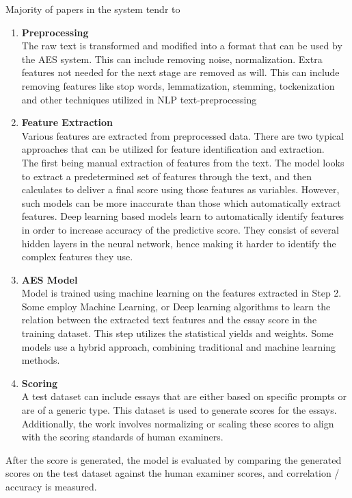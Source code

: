 \documentclass{article}
\begin{document}
Majority of papers in the system tendr to 
\begin{enumerate}
    \item \textbf{Preprocessing} \\ The raw text is transformed and modified into a format that can be used by the AES system. This can include removing noise, normalization. Extra features not needed for the next stage are removed as will. This can include removing features like stop words, lemmatization, stemming, tockenization and other techniques utilized in NLP text-preprocessing

    \item \textbf{Feature Extraction} \\ Various features are extracted from preprocessed data. There are two typical approaches that can be utilized for feature identification and extraction. \\ The first being manual extraction of features from the text. The model looks to extract a predetermined set of features through the text, and then calculates to deliver a final score using those features as variables. However, such models can be more inaccurate than those which automatically extract features. Deep learning based models learn to automatically identify features in order to increase accuracy of the predictive score. They consist of several hidden layers in the neural network, hence making it harder to identify the complex features they use.

    \item \textbf{AES Model} \\ Model is trained using machine learning on the features extracted in Step 2. Some employ  Machine Learning, or Deep learning algorithms to learn the relation between the extracted text features and the essay score in the training dataset. This step utilizes the statistical yields and weights. Some models use a hybrid approach, combining traditional and machine learning methods.
    \item \textbf{Scoring} \\ A test dataset can include essays that are either based on specific prompts or are of a generic type. This dataset is used to generate scores for the essays. Additionally, the work involves normalizing or scaling these scores to align with the scoring standards of human examiners.
\end{enumerate}
After the score is generated, the model is evaluated by comparing the generated scores on the test dataset against the human examiner scores, and correlation / accuracy is measured.
\end{document}
